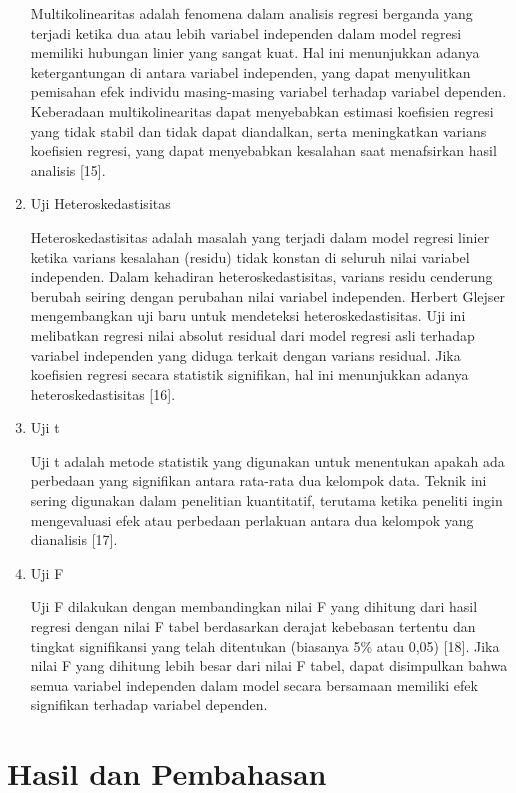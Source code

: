 \begin{enumerate}
        Multikolinearitas adalah fenomena dalam analisis regresi berganda yang terjadi ketika dua atau lebih variabel independen dalam model regresi memiliki hubungan linier yang sangat kuat. Hal ini menunjukkan adanya ketergantungan di antara variabel independen, yang dapat menyulitkan pemisahan efek individu masing-masing variabel terhadap variabel dependen. Keberadaan multikolinearitas dapat menyebabkan estimasi koefisien regresi yang tidak stabil dan tidak dapat diandalkan, serta meningkatkan varians koefisien regresi, yang dapat menyebabkan kesalahan saat menafsirkan hasil analisis [15].

        \item Uji Heteroskedastisitas

        Heteroskedastisitas adalah masalah yang terjadi dalam model regresi linier ketika varians kesalahan (residu) tidak konstan di seluruh nilai variabel independen. Dalam kehadiran heteroskedastisitas, varians residu cenderung berubah seiring dengan perubahan nilai variabel independen. Herbert Glejser mengembangkan uji baru untuk mendeteksi heteroskedastisitas. Uji ini melibatkan regresi nilai absolut residual dari model regresi asli terhadap variabel independen yang diduga terkait dengan varians residual. Jika koefisien regresi secara statistik signifikan, hal ini menunjukkan adanya heteroskedastisitas [16].

        \item Uji t

        Uji t adalah metode statistik yang digunakan untuk menentukan apakah ada perbedaan yang signifikan antara rata-rata dua kelompok data. Teknik ini sering digunakan dalam penelitian kuantitatif, terutama ketika peneliti ingin mengevaluasi efek atau perbedaan perlakuan antara dua kelompok yang dianalisis [17].

        \item Uji F

        Uji F dilakukan dengan membandingkan nilai F yang dihitung dari hasil regresi dengan nilai F tabel berdasarkan derajat kebebasan tertentu dan tingkat signifikansi yang telah ditentukan (biasanya 5\% atau 0,05) [18]. Jika nilai F yang dihitung lebih besar dari nilai F tabel, dapat disimpulkan bahwa semua variabel independen dalam model secara bersamaan memiliki efek signifikan terhadap variabel dependen.
    \end{enumerate}

\section{Hasil dan Pembahasan}

